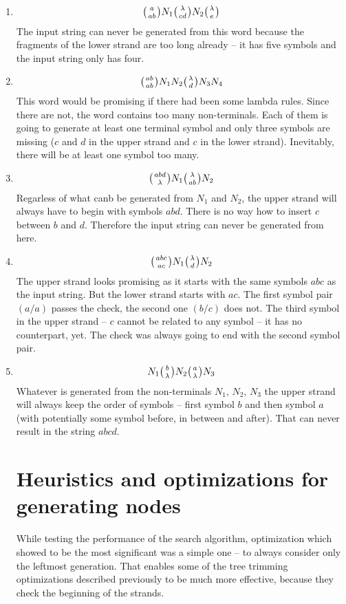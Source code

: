\begin{enumerate}
\item{
$$\wkpair{a}{ab} N_1 \wkpair{\lambda}{cd} N_2 \wkpair{\lambda}{e}$$
The input string can never be generated from this word because the fragments of the lower strand are too long already -- it has five symbols and the input string only has four.
}
\item{
$$\wkpair{ab}{ab} N_1 N_2 \wkpair{\lambda}{d} N_3 N_4$$
This word would be promising if there had been some lambda rules. Since there are not, the word contains too many non-terminals. Each of them is going to generate at least one terminal symbol and only three symbols are missing ($c$ and $d$ in the upper strand and $c$ in the lower strand). Inevitably, there will be at least one symbol too many.
}
\item{
$$\wkpair{abd}{\lambda} N_1 \wkpair{\lambda}{ab} N_2$$
Regarless of what canb be generated from $N_1$ and $N_2$, the upper strand will always have to begin with symbols $abd$. There is no way how to insert $c$ between $b$ and $d$. Therefore the input string can never be generated from here.
}
\item{
$$\wkpair{abc}{ac} N_1 \wkpair{\lambda}{d} N_2$$
The upper strand looks promising as it starts with the same symbols $abc$ as the input string. But the lower strand starts with $ac$. The first symbol pair $(a/a)$ passes the check, the second one $(b/c)$ does not. The third symbol in the upper strand -- $c$ cannot be related to any symbol -- it has no counterpart, yet. The check was always going to end with the second symbol pair.
}
\item{
$$N_1 \wkpair{b}{\lambda} N_2 \wkpair{a}{\lambda} N_3$$
Whatever is generated from the non-terminals $N_1$, $N_2$, $N_3$ the upper strand will always keep the order of symbols -- first symbol $b$ and then symbol $a$ (with potentially some symbol before, in between and after). That can never result in the string $abcd$.
}

\section{Heuristics and optimizations for generating nodes}
While testing the performance of the search algorithm, optimization which showed to be the most significant was a simple one -- to always consider only the leftmost generation. That enables some of the tree trimming optimizations described previously to be much more effective, because they check the beginning of the strands.


\end{enumerate}

